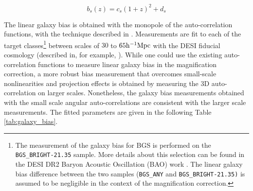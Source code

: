 \begin{equation}
    b_s(z)=c_s(1+z)^2+d_s
\end{equation}

The linear galaxy bias is obtained with the monopole of the auto-correlation functions, with the technique described in \cite{Chaussidon2025QSOLRGPNG}. Measurements are fit to each of the target classes\footnote{The measurement of the galaxy bias for BGS is performed on the \texttt{BGS\_BRIGHT-21.35} sample. More details about this selection can be found in the DESI DR2 Baryon Acoustic Oscillation (BAO) work \cite{DESI.DR2.II.BAO}. The linear galaxy bias difference between the two samples (\texttt{BGS\_ANY} and \texttt{BGS\_BRIGHT-21.35)} is assumed to be negligible in the context of the magnification correction.} between scales of $30$ to $65\mathrm{h}^{-1}\mathrm{Mpc}$ with the DESI fiducial cosmology (described in, for example, \cite{DESI.2024.III.FiducialCosmology.BAO}). While one could use the existing auto-correlation functions to measure linear galaxy bias in the magnification correction, a more robust bias measurement that overcomes small-scale nonlinearities and projection effects is obtained by measuring the 3D auto-correlation on larger scales. Nonetheless, the galaxy bias measurements obtained with the small scale angular auto-correlations are consistent with the larger scale measurements. The fitted parameters are given in the following Table \ref{tab:galaxy_bias}. 

